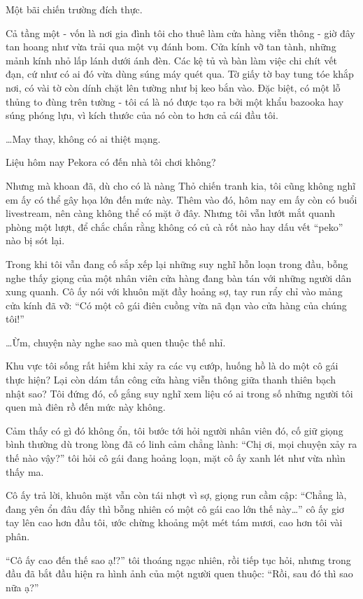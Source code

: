 \documentclass[../main.tex]{subfiles}
\begin{document}
Một bãi chiến trường đích thực.

Cả tầng một - vốn là nơi gia đình tôi cho thuê làm cửa hàng viễn thông - giờ đây tan hoang như vừa trải qua một vụ đánh bom. Cửa kính vỡ tan tành, những mảnh kính nhỏ lấp lánh dưới ánh đèn. Các kệ tủ và bàn làm việc chi chít vết đạn, cứ như có ai đó vừa dùng súng máy quét qua. Tờ giấy tờ bay tung tóe khắp nơi, có vài tờ còn dính chặt lên tường như bị keo bắn vào. Đặc biệt, có một lỗ thủng to đùng trên tường - tôi cá là nó được tạo ra bởi một khẩu bazooka hay súng phóng lựu, vì kích thước của nó còn to hơn cả cái đầu tôi.

\dots May thay, không có ai thiệt mạng.

Liệu hôm nay Pekora có đến nhà tôi chơi không?

Nhưng mà khoan đã, dù cho có là nàng Thỏ chiến tranh kia, tôi cũng không nghĩ em ấy có thể gây họa lớn đến mức này. Thêm vào đó, hôm nay em ấy còn có buổi livestream, nên càng không thể có mặt ở đây. Nhưng tôi vẫn lướt mắt quanh phòng một lượt, để chắc chắn rằng không có củ cà rốt nào hay dấu vết ``peko'' nào bị sót lại.

Trong khi tôi vẫn đang cố sắp xếp lại những suy nghĩ hỗn loạn trong đầu, bỗng nghe thấy giọng của một nhân viên cửa hàng đang bàn tán với những người dân xung quanh. Cô ấy nói với khuôn mặt đầy hoảng sợ, tay run rẩy chỉ vào mảng cửa kính đã vỡ: ``Có một cô gái điên cuồng vừa nã đạn vào cửa hàng của chúng tôi!''

\dots Ừm, chuyện này nghe sao mà quen thuộc thế nhỉ.

Khu vực tôi sống rất hiếm khi xảy ra các vụ cướp, huống hồ là do một cô gái thực hiện? Lại còn dám tấn công cửa hàng viễn thông giữa thanh thiên bạch nhật sao? Tôi đứng đó, cố gắng suy nghĩ xem liệu có ai trong số những người tôi quen mà điên rồ đến mức này không.

Cảm thấy có gì đó không ổn, tôi bước tới hỏi người nhân viên đó, cố giữ giọng bình thường dù trong lòng đã có linh cảm chẳng lành: ``Chị ơi, mọi chuyện xảy ra thế nào vậy?'' tôi hỏi cô gái đang hoảng loạn, mặt cô ấy xanh lét như vừa nhìn thấy ma.

Cô ấy trả lời, khuôn mặt vẫn còn tái nhợt vì sợ, giọng run cầm cập: ``Chẳng là, đang yên ổn đâu đấy thì bỗng nhiên có một cô gái cao lớn thế này\dots'' cô ấy giơ tay lên cao hơn đầu tôi, ước chừng khoảng một mét tám mươi, cao hơn tôi vài phân.

``Cô ấy cao đến thế sao ạ!?'' tôi thoáng ngạc nhiên, rồi tiếp tục hỏi, nhưng trong đầu đã bắt đầu hiện ra hình ảnh của một người quen thuộc: ``Rồi, sau đó thì sao nữa ạ?''
\end{document}
